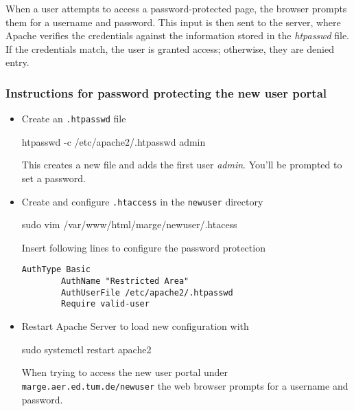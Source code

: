 When a user attempts to access a password-protected page, the browser prompts
them for a username and password. This input is then sent to the server, where
Apache verifies the credentials against the information stored in the
\textit{htpasswd} file. If the credentials match, the user is granted access;
otherwise, they are denied entry.

\subsubsection*{Instructions for password protecting the new user portal}

\begin{itemize}
    \item Create an \texttt{.htpasswd} file
    \begin{terminal}
        htpasswd -c /etc/apache2/.htpasswd admin
    \end{terminal}
    This creates a new file and adds the first user \textit{admin}. You'll be
    prompted to set a password.
    \item Create and configure \texttt{.htaccess} in the \texttt{newuser}
    directory
    \begin{terminal}
        sudo vim /var/www/html/marge/newuser/.htacess
    \end{terminal}
    Insert following lines to configure the password protection
    \begin{lstlisting}[frame={l}]
        AuthType Basic
        AuthName "Restricted Area"
        AuthUserFile /etc/apache2/.htpasswd
        Require valid-user
    \end{lstlisting}
    \item Restart Apache Server to load new configuration with
    \begin{terminal}
        sudo systemctl restart apache2
    \end{terminal} 

    When trying to access the new user portal under
    \texttt{marge.aer.ed.tum.de/newuser} the web browser prompts for a username
    and password.
    
\end{itemize}
